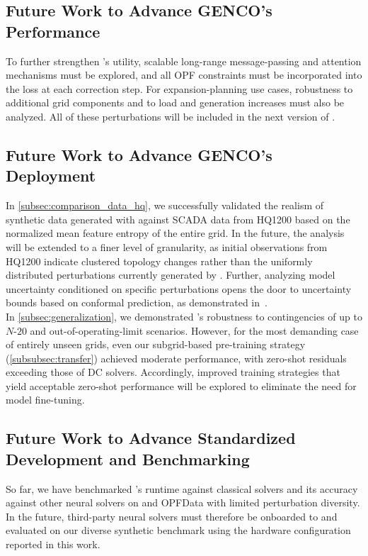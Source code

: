 \subsection{Future Work to Advance GENCO's Performance}
To further strengthen \genco's utility, scalable long-range message-passing and attention mechanisms must be explored, and all OPF constraints must be incorporated into the loss at each correction step. For expansion-planning use cases, robustness to additional grid components and to load and generation increases must also be analyzed. All of these perturbations will be included in the next version of \datakit.

\subsection{Future Work to Advance GENCO's Deployment}
In \cref{subsec:comparison_data_hq}, we successfully validated the realism of synthetic data generated with \datakit against SCADA data from HQ1200 based on the normalized mean feature entropy of the entire grid. In the future, the analysis will be extended to a finer level of granularity, as initial observations from HQ1200 indicate clustered topology changes rather than the uniformly distributed perturbations currently generated by \datakit. Further, analyzing model uncertainty conditioned on specific perturbations opens the door to uncertainty bounds based on conformal prediction, as demonstrated in~\cite{alcantara2026trustworthinesslayerfoundationmodels}.\\

In \cref{subsec:generalization}, we demonstrated \genco's robustness to contingencies of up to $N$-$20$ and out-of-operating-limit scenarios. However, for the most demanding case of entirely unseen grids, even our subgrid-based pre-training strategy (\cref{subsubsec:transfer}) achieved moderate performance, with zero-shot residuals exceeding those of DC solvers. Accordingly, improved training strategies that yield acceptable zero-shot performance will be explored to eliminate the need for model fine-tuning.

\subsection{Future Work to Advance Standardized Development and Benchmarking}
So far, we have benchmarked \genco's runtime against classical solvers and its accuracy against other neural solvers on \pfdelta and OPFData with limited perturbation diversity. In the future, third-party neural solvers must therefore be onboarded to \graphkit and evaluated on our diverse synthetic \datakit benchmark using the hardware configuration reported in this work. \\

